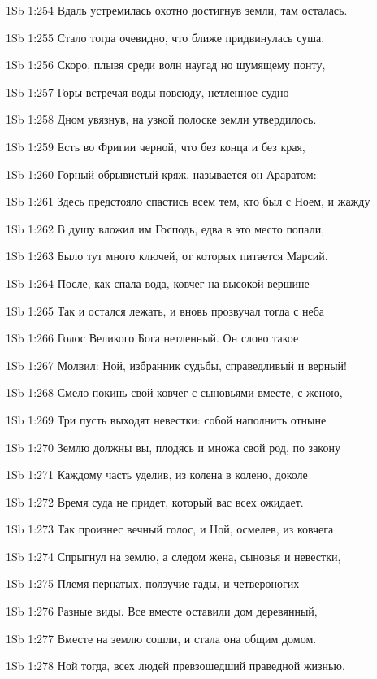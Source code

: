 \vs 1Sb 1:254 Вдаль устремилась охотно  достигнув земли, там осталась.

\vs 1Sb 1:255 Стало тогда очевидно, что ближе придвинулась суша.

\vs 1Sb 1:256 Скоро, плывя среди волн наугад но шумящему понту,

\vs 1Sb 1:257 Горы встречая воды повсюду, нетленное судно

\vs 1Sb 1:258 Дном увязнув, на узкой полоске земли утвердилось.

\vs 1Sb 1:259 Есть во Фригии черной, что без конца и без края,

\vs 1Sb 1:260 Горный обрывистый кряж, называется он Араратом:

\vs 1Sb 1:261 Здесь предстояло спастись всем тем, кто был с Ноем,  и жажду

\vs 1Sb 1:262 В душу вложил им Господь, едва в это место попали,

\vs 1Sb 1:263 Было тут много ключей, от которых питается Марсий.

\vs 1Sb 1:264 После, как спала вода, ковчег на высокой вершине

\vs 1Sb 1:265 Так и остался лежать, и вновь прозвучал тогда с неба

\vs 1Sb 1:266 Голос Великого Бога нетленный. Он слово такое

\vs 1Sb 1:267 Молвил: Ной, избранник судьбы, справедливый и верный!

\vs 1Sb 1:268 Смело покинь свой ковчег с сыновьями вместе, с женою,

\vs 1Sb 1:269 Три пусть выходят невестки: собой наполнить отныне

\vs 1Sb 1:270 Землю должны вы, плодясь и множа свой род, по закону

\vs 1Sb 1:271 Каждому часть уделив, из колена в колено, доколе

\vs 1Sb 1:272 Время суда не придет, который вас всех ожидает.

\vs 1Sb 1:273 Так произнес вечный голос, и Ной, осмелев, из ковчега

\vs 1Sb 1:274 Спрыгнул на землю, а следом  жена, сыновья и невестки,

\vs 1Sb 1:275 Племя пернатых, ползучие гады, и четвероногих

\vs 1Sb 1:276 Разные виды. Все вместе оставили дом деревянный,

\vs 1Sb 1:277 Вместе на землю сошли, и стала она общим домом.

\vs 1Sb 1:278 Ной тогда, всех людей превзошедший праведной жизнью,

